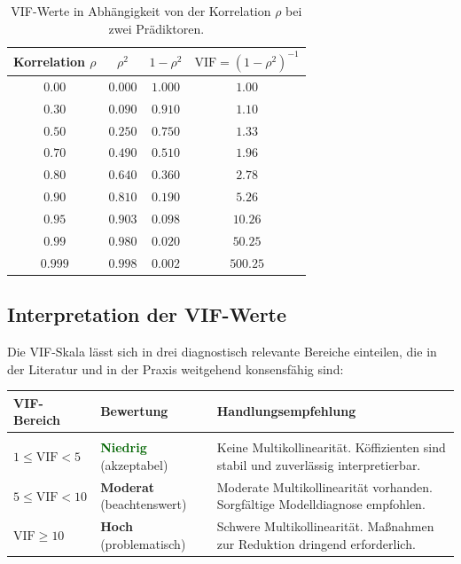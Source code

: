 ﻿\documentclass[12pt, a4paper]{article}
\theoremstyle{definition}
\theoremstyle{remark}
\begin{document}
\begin{table}[H]
	\centering
	\caption{VIF-Werte in Abhängigkeit von der Korrelation $\rho$ bei zwei Prädiktoren.}
	\label{tab:vif_rho}
	\begin{tabular}{cccc}
		\toprule
		Korrelation $\rho$ & $\rho^2$ & $1 - \rho^2$ & $\mathrm{VIF} = (1-\rho^2)^{-1}$ \\
		\midrule
		$0.00$ & $0.000$ & $1.000$ & $1.00$ \\
		$0.30$ & $0.090$ & $0.910$ & $1.10$ \\
		$0.50$ & $0.250$ & $0.750$ & $1.33$ \\
		$0.70$ & $0.490$ & $0.510$ & $1.96$ \\
		$0.80$ & $0.640$ & $0.360$ & $2.78$ \\
		$0.90$ & $0.810$ & $0.190$ & $5.26$ \\
		$0.95$ & $0.903$ & $0.098$ & $10.26$ \\
		$0.99$ & $0.980$ & $0.020$ & $50.25$ \\
		$0.999$ & $0.998$ & $0.002$ & $500.25$ \\
		\bottomrule
	\end{tabular}
\end{table}

\subsection{Interpretation der VIF-Werte}

Die VIF-Skala lässt sich in drei diagnostisch relevante Bereiche einteilen, die in der
Literatur und in der Praxis weitgehend konsensfähig sind:

\begin{tcolorbox}[thmbox, title={VIF-Klassifikationsschema}]
	\begin{tabular}{p{3cm}p{3.5cm}p{7cm}}
		\textbf{VIF-Bereich} & \textbf{Bewertung} & \textbf{Handlungsempfehlung} \\[4pt]
		\hline\\[-6pt]
		$1 \leq \mathrm{VIF} < 5$ & \textcolor{darkgreen}{\textbf{Niedrig}} (akzeptabel) & 
		Keine Multikollinearität. Köffizienten sind stabil und zuverlässig interpretierbar. \\[6pt]
		$5 \leq \mathrm{VIF} < 10$ & \textcolor{orange!80!black}{\textbf{Moderat}} (beachtenswert) & 
		Moderate Multikollinearität vorhanden. Sorgfältige Modelldiagnose empfohlen. \\[6pt]
		$\mathrm{VIF} \geq 10$ & \textcolor{accentred}{\textbf{Hoch}} (problematisch) & 
		Schwere Multikollinearität. Maßnahmen zur Reduktion dringend erforderlich. \\
	\end{tabular}
\end{tcolorbox}
\end{document}
